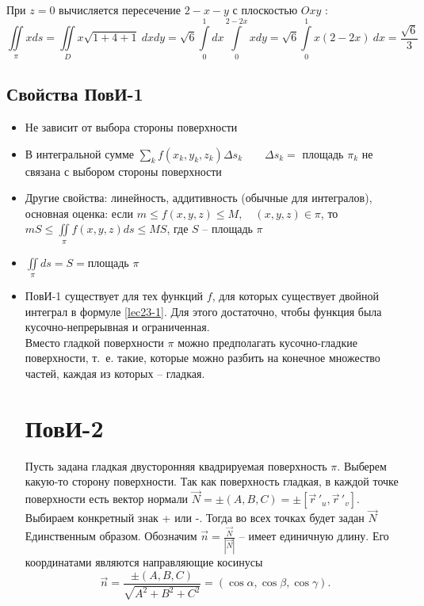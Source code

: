 \documentclass[../../main.tex]{subfiles}
\begin{document}
\begin{exmps}
\begin{enumerate}
	При $z = 0$ вычисляется пересечение $2 -x-y$ с плоскостью $Oxy$ :
	\[\iint \limits_\pi x ds = \iint \limits_D x \sqrt{1 + 4 +1} \  dx dy = 
	\sqrt{6}
	 \int \limits_0^1  dx \int \limits_0^{2 - 2x} x dy = \sqrt 6 \int \limits_0^1 
	 x(2 -2x) \ dx = \frac{\sqrt 6}{3}\] 
	 \end{enumerate}
	\end{exmps}
	\subsection{Свойства ПовИ-1}
	\begin{itemize}
		\item 	Не зависит от выбора стороны поверхности
		\item	В интегральной сумме $\sum\limits_{k} f(x_k, y_k, z_k) \Delta s_k
		 \qquad \Delta s_k = $ площадь $\pi_k$ не связана с выбором стороны 
		 поверхности
		\item Другие свойства: линейность, аддитивность (обычные для интегралов),
		 основная оценка: если $m \leq f(x, y, z) \leq M, \quad (x, y, z) \in \pi$,
		  то $mS \leq \iint \limits_\pi f(x, y, z) ds \leq MS$, где $S$ \---
		   площадь $\pi$
		\item $\iint \limits_\pi ds  = S = $площадь $\pi$
		\item ПовИ-1 существует для тех функций $f$, для которых существует двойной
		 интеграл в формуле \eqref{lec23-1}. Для этого достаточно, чтобы функция была
		  кусочно-непрерывная и ограниченная.\\
		Вместо гладкой поверхности $\pi$ можно предполагать кусочно-гладкие
		 поверхности, т.~е. такие, которые можно разбить на конечное множество
		  частей, каждая из которых \--- гладкая.\\
		\section{ПовИ-2}
		Пусть задана гладкая двусторонняя квадрируемая поверхность $\pi$. Выберем
		 какую-то сторону поверхности. Так как поверхность гладкая, в каждой точке
		  поверхности есть вектор нормали $\vec{N} = \pm (A, B,C) = \pm
		   [\vec r\,'_u, \vec r\,'_v]$. Выбираем конкретный
		    знак + или -. Тогда во всех точках будет задан $\vec{N}$
		     Единственным образом. Обозначим $\vec{n} =
		      \frac{\vec{N}}{|\vec{N}|}$ \--- имеет
		       единичную длину. Его координатами являются
		       направляющие косинусы
		\[\vec{n} = \frac{\pm(A,B,C)}{\sqrt{A^2 +B^2 + C^2}} = 
		(\cos \alpha, \cos \beta, \cos \gamma).\]

\end{itemize}
\end{document}
